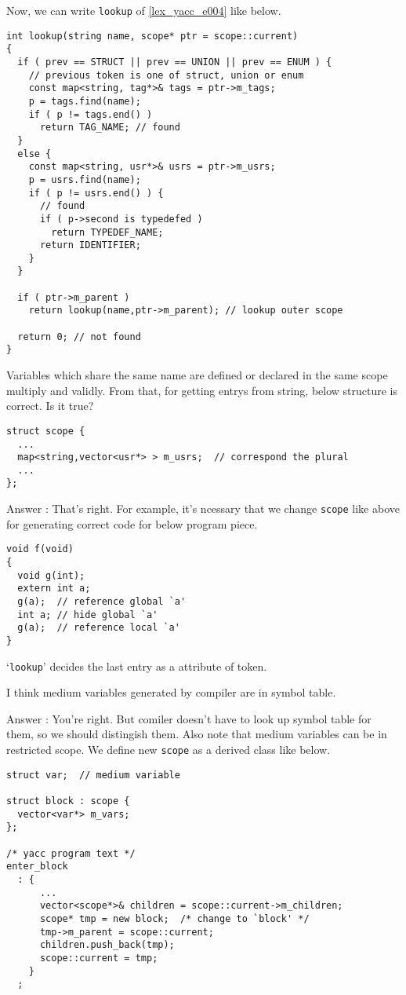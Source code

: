 Now, we can write  {\tt{lookup}} of \ref{lex_yacc_e004} like below.
\begin{verbatim}
int lookup(string name, scope* ptr = scope::current)
{
  if ( prev == STRUCT || prev == UNION || prev == ENUM ) {
    // previous token is one of struct, union or enum
    const map<string, tag*>& tags = ptr->m_tags;
    p = tags.find(name);
    if ( p != tags.end() )
      return TAG_NAME; // found
  }
  else {
    const map<string, usr*>& usrs = ptr->m_usrs;
    p = usrs.find(name);
    if ( p != usrs.end() ) {
      // found
      if ( p->second is typedefed )
        return TYPEDEF_NAME;
      return IDENTIFIER;
    }
  }

  if ( ptr->m_parent )
    return lookup(name,ptr->m_parent); // lookup outer scope

  return 0; // not found
}
\end{verbatim}

\begin{QandA}
Variables which share the same name are defined or declared
in the same scope multiply and validly. From that, for getting
entrys from string, below structure is correct. Is it true?
\begin{verbatim}
struct scope {
  ...
  map<string,vector<usr*> > m_usrs;  // correspond the plural
  ...
};
\end{verbatim}

Answer : That's right. For example, it's ncessary that
we change {\tt {scope}} like above for generating correct
code for below program piece.
\begin{verbatim}
void f(void)
{
  void g(int);
  extern int a;
  g(a);  // reference global `a'
  int a; // hide global `a'
  g(a);  // reference local `a'
}
\end{verbatim}
`{\tt{lookup}}' decides the last entry as a attribute of token.
\end{QandA}

\begin{QandA}
I think medium variables generated by compiler are in symbol table.

Answer : You're right. But comiler doesn't have to look up symbol table
for them, so we should distingish them. Also note that medium variables
can be in restricted scope. We define new {\tt{scope}} as a derived
class like below.
\begin{verbatim}
struct var;  // medium variable

struct block : scope {
  vector<var*> m_vars;
};

/* yacc program text */
enter_block
  : {
      ...
      vector<scope*>& children = scope::current->m_children;
      scope* tmp = new block;  /* change to `block' */
      tmp->m_parent = scope::current;
      children.push_back(tmp);
      scope::current = tmp;
    }
  ;
\end{verbatim}
\end{QandA}

